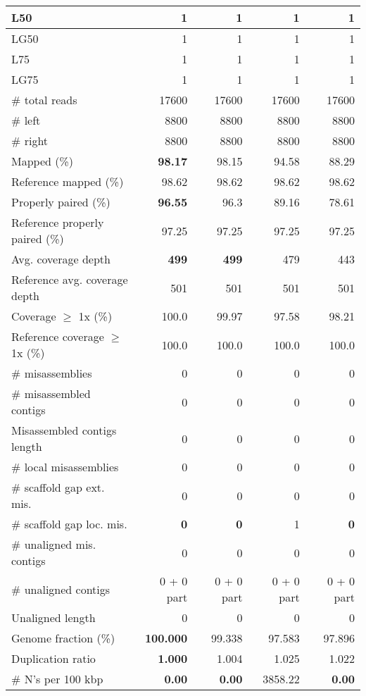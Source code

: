 \documentclass[12pt,a4paper]{article}
\begin{document}
\begin{table}[ht]
\begin{center}
\begin{tabular}{|l*{4}{|r}|}
L50 & 1 & 1 & 1 & 1 \\ \hline
LG50 & 1 & 1 & 1 & 1 \\ \hline
L75 & 1 & 1 & 1 & 1 \\ \hline
LG75 & 1 & 1 & 1 & 1 \\ \hline
\# total reads & 17600 & 17600 & 17600 & 17600 \\ \hline
\# left & 8800 & 8800 & 8800 & 8800 \\ \hline
\# right & 8800 & 8800 & 8800 & 8800 \\ \hline
Mapped (\%) & {\bf 98.17} & 98.15 & 94.58 & 88.29 \\ \hline
Reference mapped (\%) & 98.62 & 98.62 & 98.62 & 98.62 \\ \hline
Properly paired (\%) & {\bf 96.55} & 96.3 & 89.16 & 78.61 \\ \hline
Reference properly paired (\%) & 97.25 & 97.25 & 97.25 & 97.25 \\ \hline
Avg. coverage depth & {\bf 499} & {\bf 499} & 479 & 443 \\ \hline
Reference avg. coverage depth & 501 & 501 & 501 & 501 \\ \hline
Coverage $\geq$ 1x (\%) & 100.0 & 99.97 & 97.58 & 98.21 \\ \hline
Reference coverage $\geq$ 1x (\%) & 100.0 & 100.0 & 100.0 & 100.0 \\ \hline
\# misassemblies & 0 & 0 & 0 & 0 \\ \hline
\# misassembled contigs & 0 & 0 & 0 & 0 \\ \hline
Misassembled contigs length & 0 & 0 & 0 & 0 \\ \hline
\# local misassemblies & 0 & 0 & 0 & 0 \\ \hline
\# scaffold gap ext. mis. & 0 & 0 & 0 & 0 \\ \hline
\# scaffold gap loc. mis. & {\bf 0} & {\bf 0} & 1 & {\bf 0} \\ \hline
\# unaligned mis. contigs & 0 & 0 & 0 & 0 \\ \hline
\# unaligned contigs & 0 + 0 part & 0 + 0 part & 0 + 0 part & 0 + 0 part \\ \hline
Unaligned length & 0 & 0 & 0 & 0 \\ \hline
Genome fraction (\%) & {\bf 100.000} & 99.338 & 97.583 & 97.896 \\ \hline
Duplication ratio & {\bf 1.000} & 1.004 & 1.025 & 1.022 \\ \hline
\# N's per 100 kbp & {\bf 0.00} & {\bf 0.00} & 3858.22 & {\bf 0.00} \\ \hline

\end{tabular}
\end{center}
\end{table}
\end{document}
